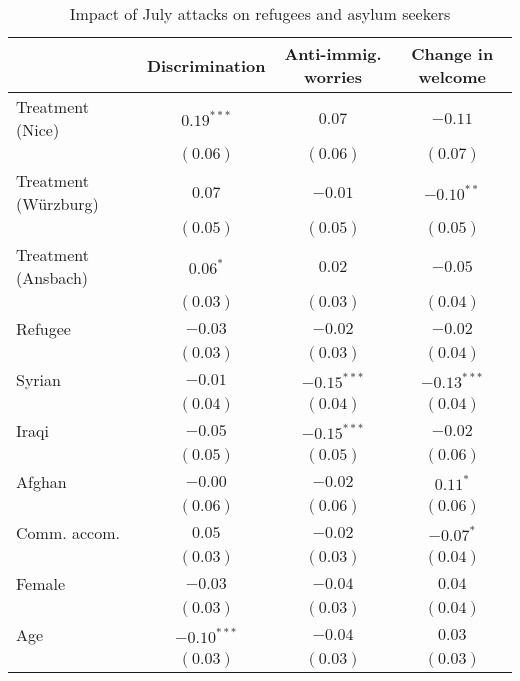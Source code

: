 
\begin{table}
\caption{Impact of July attacks on refugees and asylum seekers}
\begin{center}
\begin{tabular}{l c c c}
\toprule
 & Discrimination & Anti-immig. worries & Change in welcome \\
\midrule
Treatment (Nice)     & $0.19^{***}$  & $0.07$        & $-0.11$       \\
                     & $(0.06)$      & $(0.06)$      & $(0.07)$      \\
Treatment (Würzburg) & $0.07$        & $-0.01$       & $-0.10^{**}$  \\
                     & $(0.05)$      & $(0.05)$      & $(0.05)$      \\
Treatment (Ansbach)  & $0.06^{*}$    & $0.02$        & $-0.05$       \\
                     & $(0.03)$      & $(0.03)$      & $(0.04)$      \\
Refugee              & $-0.03$       & $-0.02$       & $-0.02$       \\
                     & $(0.03)$      & $(0.03)$      & $(0.04)$      \\
Syrian               & $-0.01$       & $-0.15^{***}$ & $-0.13^{***}$ \\
                     & $(0.04)$      & $(0.04)$      & $(0.04)$      \\
Iraqi                & $-0.05$       & $-0.15^{***}$ & $-0.02$       \\
                     & $(0.05)$      & $(0.05)$      & $(0.06)$      \\
Afghan               & $-0.00$       & $-0.02$       & $0.11^{*}$    \\
                     & $(0.06)$      & $(0.06)$      & $(0.06)$      \\
Comm. accom.         & $0.05$        & $-0.02$       & $-0.07^{*}$   \\
                     & $(0.03)$      & $(0.03)$      & $(0.04)$      \\
Female               & $-0.03$       & $-0.04$       & $0.04$        \\
                     & $(0.03)$      & $(0.03)$      & $(0.04)$      \\
Age                  & $-0.10^{***}$ & $-0.04$       & $0.03$        \\
                     & $(0.03)$      & $(0.03)$      & $(0.03)$      \\

\end{tabular}
\end{center}
\end{table}
